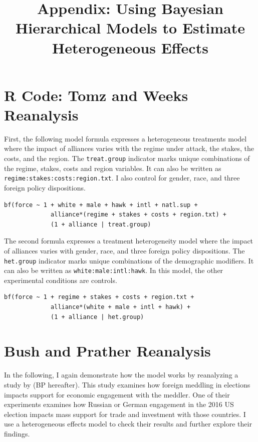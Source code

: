 \documentclass[12pt]{article}
\title{\textbf{Appendix: Using Bayesian Hierarchical Models to Estimate Heterogeneous Effects}}
\date{}
\begin{document}
\maketitle 

\singlespace 

\tableofcontents

\bigskip


\section{R Code: Tomz and Weeks Reanalysis}

First, the following model formula expresses a heterogeneous treatments model where the impact of alliances varies with the regime under attack, the stakes, the costs, and the region. 
The \verb+treat.group+ indicator marks unique combinations of the regime, stakes, costs and region variables. 
It can also be written as \verb+regime:stakes:costs:region.txt+. 
I also control for gender, race, and three foreign policy dispositions. 

\begin{verbatim}
bf(force ~ 1 + white + male + hawk + intl + natl.sup + 
             alliance*(regime + stakes + costs + region.txt) + 
             (1 + alliance | treat.group) 
\end{verbatim}


The second formula expresses a treatment heterogeneity model where the impact of alliances varies with gender, race, and three foreign policy dispositions. 
The \verb+het.group+ indicator marks unique combinations of the demographic modifiers.
It can also be written as \verb+white:male:intl:hawk+. 
In this model, the other experimental conditions are controls. 

\begin{verbatim}
bf(force ~ 1 + regime + stakes + costs + region.txt +
             alliance*(white + male + intl + hawk) +
             (1 + alliance | het.group) 
\end{verbatim}



\section{Bush and Prather Reanalysis}


In the following, I again demonstrate how the model works by reanalyzing a study by \citet{BushPrather2020} (BP hereafter). 
This study examines how foreign meddling in elections impacts support for economic engagement with the meddler. 
One of their experiments examines how Russian or German engagement in the 2016 US election impacts mass support for trade and investment with those countries.
I use a heterogeneous effects model to check their results and further explore their findings. 
\end{document}

